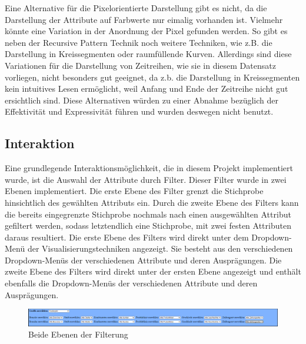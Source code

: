 \documentclass[usegeometry=true]{scrartcl}
\begin{document}
\noindent Eine Alternative für die Pixelorientierte Darstellung gibt es nicht, da die Darstellung der Attribute auf Farbwerte nur eimalig vorhanden ist. Vielmehr könnte eine
Variation in der Anordnung der Pixel gefunden werden. So gibt es neben der Recursive Pattern Technik noch weitere Techniken, wie z.B. die Darstellung in Kreissegmenten oder
raumfüllende Kurven. \cite[5]{yeqiang2017visualizing} Allerdings sind diese Variationen für die Darstellung von Zeitreihen, wie sie in diesem Datensatz vorliegen, nicht besonders
gut geeignet, da z.b. die Darstellung in Kreissegmenten kein intuitives Lesen ermöglicht, weil Anfang und Ende der Zeitreihe nicht gut ersichtlich sind. Diese Alternativen würden
zu einer Abnahme bezüglich der Effektivität und Expressivität führen und wurden deswegen nicht benutzt.

\subsection{Interaktion}
Eine grundlegende Interaktionsmöglichkeit, die in diesem Projekt implementiert wurde, ist die Auswahl der Attribute durch Filter. Dieser Filter wurde in zwei Ebenen implementiert.
Die erste Ebene des Filter grenzt die Stichprobe hinsichtlich des gewählten Attributs ein. Durch die zweite Ebene des Filters kann die bereits eingegrenzte Stichprobe nochmals
nach einen ausgewählten Attribut gefiltert werden, sodass letztendlich eine Stichprobe, mit zwei festen Attributen daraus resultiert. Die erste Ebene des Filters wird direkt
unter dem Dropdown-Menü der Visualisierungstechniken angezeigt. Sie besteht aus den verschiedenen Dropdown-Menüs der verschiedenen Attribute und deren Ausprägungen. Die zweite
Ebene des Filters wird direkt unter der ersten Ebene angezeigt und enthält ebenfalls die Dropdown-Menüs der verschiedenen Attribute und deren Ausprägungen.\\

\begin{figure} [H]
	\begin{center}
		\includegraphics[width=16cm]{IMG/Filterung}
		\caption{Beide Ebenen der Filterung}
		\label{fig:Filterung}
	\end{center}
\end{figure}
\end{document}
